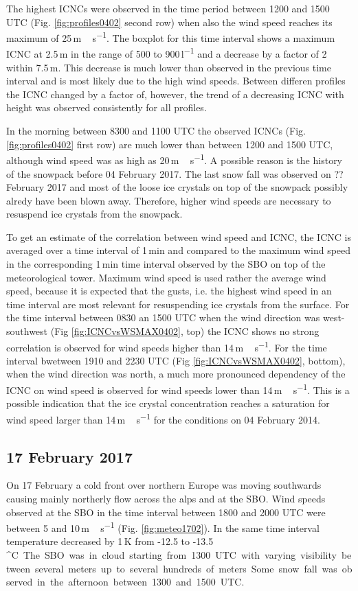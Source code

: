 \documentclass[draft,linenumbers]{agujournal}
\begin{document}
The highest ICNCs were observed in the time period between 1200 and 1500 UTC (Fig. \ref{fig:profiles0402} second row) when also the wind speed reaches its maximum of 25\,\si{m\,s^{-1}}. The boxplot for this time interval shows a maximum ICNC at 2.5\,\si{m} in the range of 500 to 900\,\si{l^{-1}} and a decrease by a factor of 2 within 7.5\,\si{m}. This decrease is much lower than observed in the previous time interval and is most likely due to the high wind speeds. Between differen profiles the ICNC changed by a factor of, however, the trend of a decreasing ICNC with height was observed consistently for all profiles.

In the morning between 8300 and 1100 UTC the observed ICNCs (Fig. \ref{fig:profiles0402} first row) are much lower than between 1200 and 1500 UTC, although wind speed was as high as 20\,\si{m\,s^{-1}}. A possible reason is the history of the snowpack before 04 February 2017. The last snow fall was observed on ?? February 2017 and most of the loose ice crystals on top of the snowpack possibly alredy have been blown away. Therefore, higher wind speeds are necessary to resuspend ice crystals from the snowpack. 

To get an estimate of the correlation between wind speed and ICNC, the ICNC is averaged over a time interval of 1\,\si{min} and compared to the maximum wind speed in the corresponding 1\,\si{min} time interval observed by the SBO on top of the meteorological tower. Maximum wind speed is used rather the average wind speed, because it is expected that the gusts, i.e. the highest wind speed in an time interval are most relevant for resuspending ice crystals from the surface. For the time interval between 0830 an 1500 UTC when the wind direction was west-southwest (Fig \ref{fig:ICNCvsWSMAX0402}, top) the ICNC shows no strong correlation is observed for wind speeds higher than 14\,\si{m\,s^{-1}}. For the time interval bwetween 1910 and 2230 UTC (Fig \ref{fig:ICNCvsWSMAX0402}, bottom), when the wind direction was north, a much more pronounced dependency of the ICNC on wind speed is observed for wind speeds lower than 14\,\si{m\,s^{-1}}. This is a possible indication that the ice crystal concentration reaches a saturation for wind speed larger than 14\,\si{m\,s^{-1}} for the conditions on 04 February 2014.

\subsection{17 February 2017}
On 17 February a cold front over northern Europe was moving southwards causing mainly northerly flow across the alps and at the SBO. Wind speeds observed at the SBO in the time interval between 1800 and 2000 UTC were between 5 and 10\,\si{m\,s^{-1}} (Fig. \ref{fig:meteo1702}).  In the same time interval temperature decreased by 1\,\si{K} from -12.5 to -13.5\,\si{^\circ C}. The SBO was in cloud starting from 1300 UTC with varying visibility between several meters up to several hundreds of meters. Some snow fall was observed in the afternoon between 1300 and 1500 UTC. 
\end{document}
